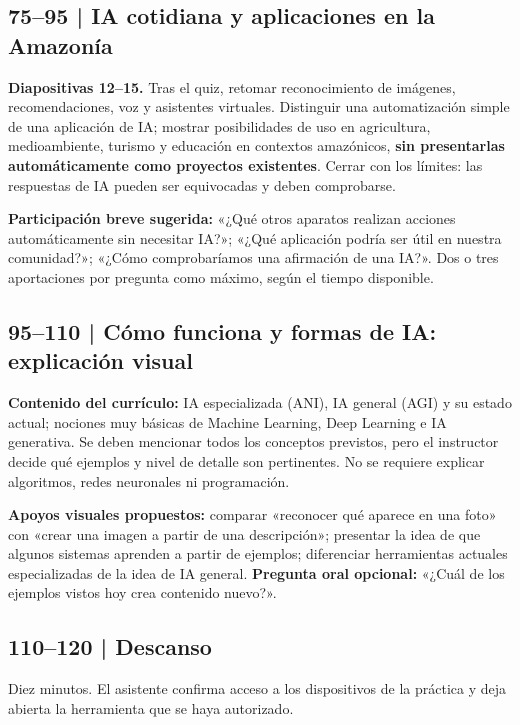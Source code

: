 \documentclass[11pt,a4paper]{article}
\begin{document}
\subsection{75--95 | IA cotidiana y aplicaciones en la Amazonía}
\textbf{Diapositivas 12--15.} Tras el quiz, retomar reconocimiento de imágenes, recomendaciones, voz y asistentes virtuales. Distinguir una automatización simple de una aplicación de IA; mostrar posibilidades de uso en agricultura, medioambiente, turismo y educación en contextos amazónicos, \textbf{sin presentarlas automáticamente como proyectos existentes}. Cerrar con los límites: las respuestas de IA pueden ser equivocadas y deben comprobarse.

\textbf{Participación breve sugerida:} «¿Qué otros aparatos realizan acciones automáticamente sin necesitar IA?»; «¿Qué aplicación podría ser útil en nuestra comunidad?»; «¿Cómo comprobaríamos una afirmación de una IA?». Dos o tres aportaciones por pregunta como máximo, según el tiempo disponible.

\subsection{95--110 | Cómo funciona y formas de IA: explicación visual}
\textbf{Contenido del currículo:} IA especializada (ANI), IA general (AGI) y su estado actual; nociones muy básicas de Machine Learning, Deep Learning e IA generativa. Se deben mencionar todos los conceptos previstos, pero el instructor decide qué ejemplos y nivel de detalle son pertinentes. No se requiere explicar algoritmos, redes neuronales ni programación.

\textbf{Apoyos visuales propuestos:} comparar «reconocer qué aparece en una foto» con «crear una imagen a partir de una descripción»; presentar la idea de que algunos sistemas aprenden a partir de ejemplos; diferenciar herramientas actuales especializadas de la idea de IA general. \textbf{Pregunta oral opcional:} «¿Cuál de los ejemplos vistos hoy crea contenido nuevo?».

\subsection{110--120 | Descanso}
Diez minutos. El asistente confirma acceso a los dispositivos de la práctica y deja abierta la herramienta que se haya autorizado.
\end{document}
